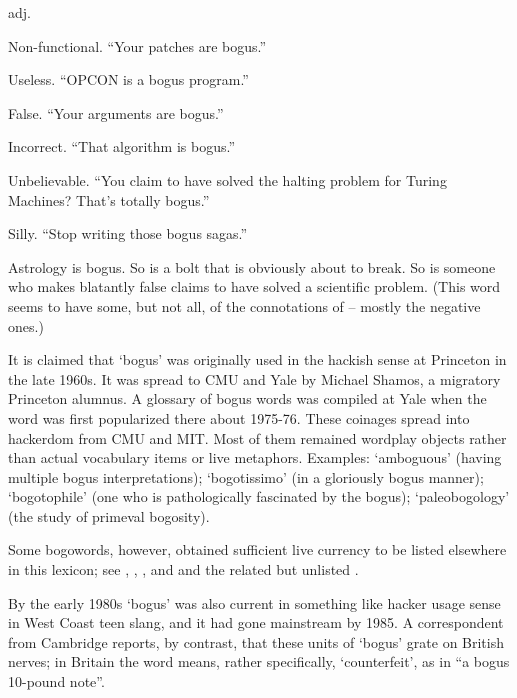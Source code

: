  adj.

\begin{inparaenum}
    \item Non-functional. ``Your patches are bogus.''
    \item Useless. ``OPCON is a bogus program.''
    \item False. ``Your arguments are bogus.''
    \item Incorrect. ``That algorithm is bogus.''
    \item Unbelievable. ``You claim to have solved the halting problem for
        Turing Machines? That's totally bogus.''
    \item Silly. ``Stop writing those bogus sagas.''
\end{inparaenum}

Astrology is bogus. So is a bolt that is obviously about to break. So is someone
who makes blatantly false claims to have solved a scientific problem. (This word
seems to have some, but not all, of the connotations of  --
mostly the negative ones.)

It is claimed that `bogus' was originally used in the hackish sense at Princeton
in the late 1960s. It was spread to CMU and Yale by Michael Shamos, a migratory
Princeton alumnus. A glossary of bogus words was compiled at Yale when the word
was first popularized there about 1975-76. These coinages spread into hackerdom
from CMU and MIT. Most of them remained wordplay objects rather than actual
vocabulary items or live metaphors. Examples: `amboguous' (having multiple bogus
interpretations); `bogotissimo' (in a gloriously bogus manner); `bogotophile'
(one who is pathologically fascinated by the bogus); `paleobogology' (the study
of primeval bogosity).

Some bogowords, however, obtained sufficient live currency to be listed
elsewhere in this lexicon; see , ,
, and  and the related but
unlisted .

By the early 1980s `bogus' was also current in something like hacker usage sense
in West Coast teen slang, and it had gone mainstream by 1985. A correspondent
from Cambridge reports, by contrast, that these units of `bogus' grate on
British nerves; in Britain the word means, rather specifically, `counterfeit',
as in ``a bogus 10-pound note''.

